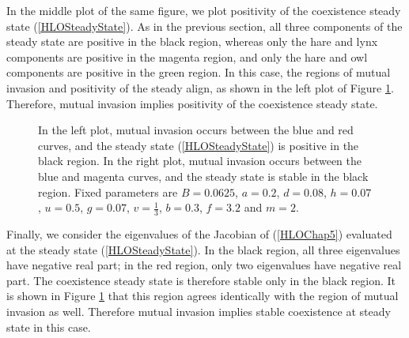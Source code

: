 \documentclass[12pt]{UOthesis}
\theoremstyle{remarkstyle}
\begin{document}
In the middle plot of the same figure, we plot positivity of the coexistence steady state (\ref{HLOSteadyState}). As in the previous section, all three components of the steady state are positive in the black region, whereas only the hare and lynx components are positive in the magenta region, and only the hare and owl components are positive in the green region. In this case, the regions of mutual invasion and positivity of the steady align, as shown in the left plot of Figure \ref{HLOPOMutualInvasionOnSteadyStateAndEigenvalues}. Therefore, mutual invasion implies positivity of the coexistence steady state.\\
\begin{figure}[h!]
	\centering
	\caption[Mutual invasion and coexistence in the original model (steady state)]{In the left plot, mutual invasion occurs between the blue and red curves, and the steady state (\ref{HLOSteadyState}) is positive in the black region. In the right plot, mutual invasion occurs between the blue and magenta curves, and the steady state is stable in the black region. Fixed parameters are $B=0.0625$, $a=0.2$, $d=0.08$, $h=0.07$, $u=0.5$, $g=0.07$, $v=\frac{1}{3}$, $b=0.3$, $f=3.2$ and $m=2$.\label{HLOPOMutualInvasionOnSteadyStateAndEigenvalues}}
\end{figure}

Finally, we consider the eigenvalues of the Jacobian of (\ref{HLOChap5}) evaluated at the steady state (\ref{HLOSteadyState}). In the black region, all three eigenvalues have negative real part; in the red region, only two eigenvalues have negative real part. The coexistence steady state is therefore stable only in the black region. It is shown in Figure \ref{HLOPOMutualInvasionOnSteadyStateAndEigenvalues} that this region agrees identically with the region of mutual invasion as well. Therefore mutual invasion implies stable coexistence at steady state in this case.\\
\end{document}
